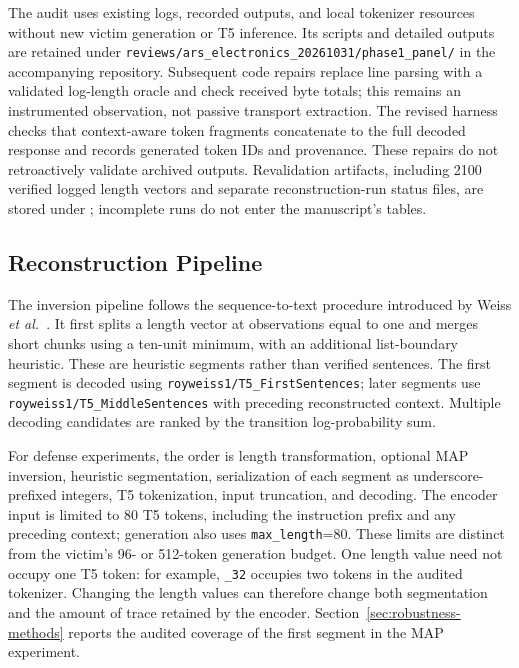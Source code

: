 \documentclass[electronics,article,submit,pdftex,moreauthors]{Definitions/mdpi}
\begin{document}
The audit uses existing logs, recorded outputs, and local tokenizer resources without new victim generation or T5 inference. Its scripts and detailed outputs are retained under \texttt{reviews/ars\_electronics\_20261031/phase1\_panel/} in the accompanying repository. Subsequent code repairs replace line parsing with a validated log-length oracle and check received byte totals; this remains an instrumented observation, not passive transport extraction. The revised harness checks that context-aware token fragments concatenate to the full decoded response and records generated token IDs and provenance. These repairs do not retroactively validate archived outputs. Revalidation artifacts, including 2100 verified logged length vectors and separate reconstruction-run status files, are stored under ; incomplete runs do not enter the manuscript's tables.

\subsection{Reconstruction Pipeline}
The inversion pipeline follows the sequence-to-text procedure introduced by Weiss \emph{et al.}~\cite{weiss2024prompt}. It first splits a length vector at observations equal to one and merges short chunks using a ten-unit minimum, with an additional list-boundary heuristic. These are heuristic segments rather than verified sentences. The first segment is decoded using \texttt{royweiss1/T5\_FirstSentences}; later segments use \texttt{royweiss1/T5\_MiddleSentences} with preceding reconstructed context. Multiple decoding candidates are ranked by the transition log-probability sum.

For defense experiments, the order is length transformation, optional MAP inversion, heuristic segmentation, serialization of each segment as underscore-prefixed integers, T5 tokenization, input truncation, and decoding. The encoder input is limited to 80 T5 tokens, including the instruction prefix and any preceding context; generation also uses \texttt{max\_length}=80. These limits are distinct from the victim's 96- or 512-token generation budget. One length value need not occupy one T5 token: for example, \texttt{\_32} occupies two tokens in the audited tokenizer. Changing the length values can therefore change both segmentation and the amount of trace retained by the encoder. Section~\ref{sec:robustness-methods} reports the audited coverage of the first segment in the MAP experiment.
\end{document}
